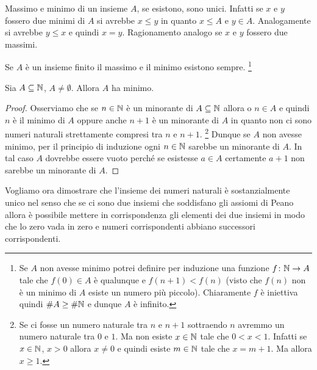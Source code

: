 Massimo e minimo di un insieme $A$, se esistono, sono unici.
Infatti se $x$ e $y$ fossero due minimi di $A$ si avrebbe $x\le y$ in
quanto $x\le A$ e $y\in A$. Analogamente si avrebbe $y\le x$ e
quindi $x=y$. Ragionamento analogo se $x$ e $y$ fossero due massimi.

Se $A$ è un insieme finito il massimo e il minimo 
esistono sempre. 
\footnote{
  Se $A$ non avesse minimo potrei definire per induzione 
  una funzione $f\colon {\mathbb N}\to A$ tale che $f(0)\in A$ 
  è qualunque e $f(n+1) < f(n)$ (visto che $f(n)$ non è un minimo 
  di $A$ esiste un numero più piccolo). 
  Chiaramente $f$ è iniettiva quindi $\#A\ge \#{\mathbb N}$
  e dunque $A$ è infinito.
}

\begin{theorem}
  \label{th:buon_ordinamento}
  Sia $A\subseteq {\mathbb N}$, $A\neq \emptyset$. 
  Allora $A$ ha minimo.
\end{theorem}
%
\begin{proof}
  Osserviamo che se $n\in {\mathbb N}$ è un minorante di $A\subseteq {\mathbb N}$ 
  allora o $n\in A$ e quindi $n$ è il minimo di $A$
  oppure anche $n+1$ è un minorante di $A$ in quanto 
  non ci sono numeri naturali strettamente compresi tra $n$ e $n+1$.
  \footnote{Se ci fosse un numero naturale tra $n$ e $n+1$ 
  sottraendo $n$ avremmo un numero naturale tra $0$ e $1$. 
  Ma non esiste $x\in {\mathbb N}$ tale che $0<x<1$.
  Infatti se $x\in {\mathbb N}$, $x>0$ allora $x\neq 0$ e quindi 
  esiste $m\in {\mathbb N}$ tale che $x=m+1$. 
  Ma allora $x\ge 1$.}
  Dunque se $A$ non avesse minimo, per il principio di induzione 
  ogni $n\in{\mathbb N}$ sarebbe un minorante di $A$.
  In tal caso $A$ dovrebbe essere vuoto perché se esistesse $a\in A$ 
  certamente $a+1$ non sarebbe un minorante di $A$.
\end{proof}

Vogliamo ora dimostrare che l'insieme dei numeri naturali è sostanzialmente 
unico nel senso che se ci sono due insiemi che soddisfano gli assiomi di 
Peano allora è possibile mettere in corrispondenza gli elementi dei due insiemi 
in modo che lo zero vada in zero e numeri corrispondenti abbiano successori 
corrispondenti.


